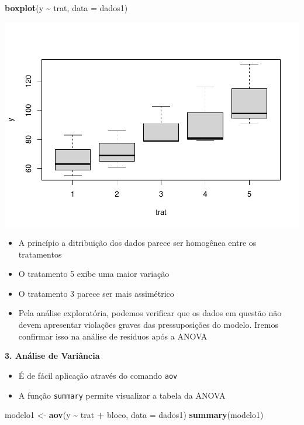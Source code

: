 \documentclass[
]{book}
\newenvironment{Shaded}{\begin{snugshade}}{\end{snugshade}}
\newcommand{\AttributeTok}[1]{\textcolor[rgb]{0.13,0.29,0.53}{#1}}
\newcommand{\FunctionTok}[1]{\textcolor[rgb]{0.13,0.29,0.53}{\textbf{#1}}}
\newcommand{\NormalTok}[1]{#1}
\newcommand{\OtherTok}[1]{\textcolor[rgb]{0.56,0.35,0.01}{#1}}
\newcommand{\SpecialCharTok}[1]{\textcolor[rgb]{0.81,0.36,0.00}{\textbf{#1}}}
\providecommand{\tightlist}{%
  \setlength{\itemsep}{0pt}\setlength{\parskip}{0pt}}
\begin{document}
\begin{Shaded}
\begin{Highlighting}[]
\FunctionTok{boxplot}\NormalTok{(y }\SpecialCharTok{\textasciitilde{}}\NormalTok{ trat, }\AttributeTok{data =}\NormalTok{ dados1)}
\end{Highlighting}
\end{Shaded}

\includegraphics{_main_files/figure-latex/box-3.pdf}

\begin{itemize}
\item
  A princípio a ditribuição dos dados parece ser homogênea entre os tratamentos
\item
  O tratamento 5 exibe uma maior variação
\item
  O tratamento 3 parece ser mais assimétrico
\item
  Pela análise exploratória, podemos verificar que os dados em questão não devem apresentar violações graves das pressuposições do modelo. Iremos confirmar isso na análise de resíduos após a ANOVA
\end{itemize}

\textbf{3. Análise de Variância}

\begin{itemize}
\tightlist
\item
  É de fácil aplicação através do comando \texttt{aov}
\item
  A função \texttt{summary} permite visualizar a tabela da ANOVA
\end{itemize}

\begin{Shaded}
\begin{Highlighting}[]
\NormalTok{modelo1 }\OtherTok{\textless{}{-}} \FunctionTok{aov}\NormalTok{(y }\SpecialCharTok{\textasciitilde{}}\NormalTok{ trat }\SpecialCharTok{+}\NormalTok{ bloco, }\AttributeTok{data =}\NormalTok{ dados1)}
\FunctionTok{summary}\NormalTok{(modelo1)}
\end{Highlighting}
\end{Shaded}
\end{document}
